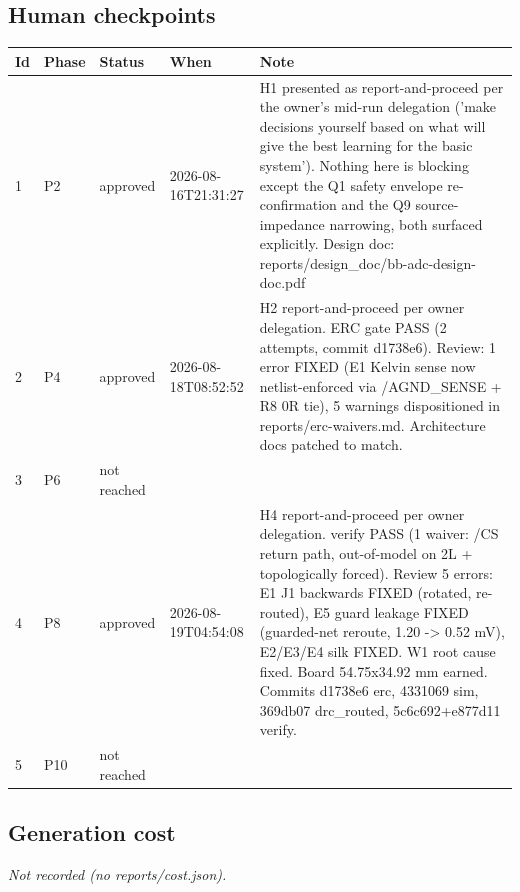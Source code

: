 \documentclass[11pt,a4paper]{article}
\begin{document}
\subsection*{Human checkpoints}
{\small
\begin{longtable}{lllp{2.6cm}p{6.4cm}}
\toprule
\textbf{Id} & \textbf{Phase} & \textbf{Status} & \textbf{When} & \textbf{Note} \\
\midrule
\endhead
1 & P2 & approved & 2026-08-16T21:31:27 & H1 presented as report-and-proceed per the owner's mid-run delegation ('make decisions yourself based on what will give the best learning for the basic system'). Nothing here is blocking except the Q1 safety envelope re-confirmation and the Q9 source-impedance narrowing, both surfaced explicitly. Design doc: reports/design\_doc/bb-adc-design-doc.pdf \\
2 & P4 & approved & 2026-08-18T08:52:52 & H2 report-and-proceed per owner delegation. ERC gate PASS (2 attempts, commit d1738e6). Review: 1 error FIXED (E1 Kelvin sense now netlist-enforced via /AGND\_SENSE + R8 0R tie), 5 warnings dispositioned in reports/erc-waivers.md. Architecture docs patched to match. \\
3 & P6 & not reached &  &  \\
4 & P8 & approved & 2026-08-19T04:54:08 & H4 report-and-proceed per owner delegation. verify PASS (1 waiver: /CS return path, out-of-model on 2L + topologically forced). Review 5 errors: E1 J1 backwards FIXED (rotated, re-routed), E5 guard leakage FIXED (guarded-net reroute, 1.20 -\textgreater{} 0.52 mV), E2/E3/E4 silk FIXED. W1 root cause fixed. Board 54.75x34.92 mm earned. Commits d1738e6 erc, 4331069 sim, 369db07 drc\_routed, 5c6c692+e877d11 verify. \\
5 & P10 & not reached &  &  \\
\bottomrule
\end{longtable}
}
\subsection*{Generation cost}
\emph{Not recorded (no reports/cost.json).}
\end{document}
